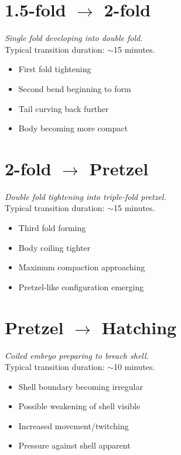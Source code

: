\documentclass[11pt,letterpaper]{article}
\begin{document}
\section{1.5-fold $\rightarrow$ 2-fold}
\textit{Single fold developing into double fold.}\\
Typical transition duration: $\sim$15 minutes.

\begin{itemize}
    \item First fold tightening
    \item Second bend beginning to form
    \item Tail curving back further
    \item Body becoming more compact
\end{itemize}

\section{2-fold $\rightarrow$ Pretzel}
\textit{Double fold tightening into triple-fold pretzel.}\\
Typical transition duration: $\sim$15 minutes.

\begin{itemize}
    \item Third fold forming
    \item Body coiling tighter
    \item Maximum compaction approaching
    \item Pretzel-like configuration emerging
\end{itemize}

\section{Pretzel $\rightarrow$ Hatching}
\textit{Coiled embryo preparing to breach shell.}\\
Typical transition duration: $\sim$10 minutes.

\begin{itemize}
    \item Shell boundary becoming irregular
    \item Possible weakening of shell visible
    \item Increased movement/twitching
    \item Pressure against shell apparent
\end{itemize}

\newpage

\end{document}
